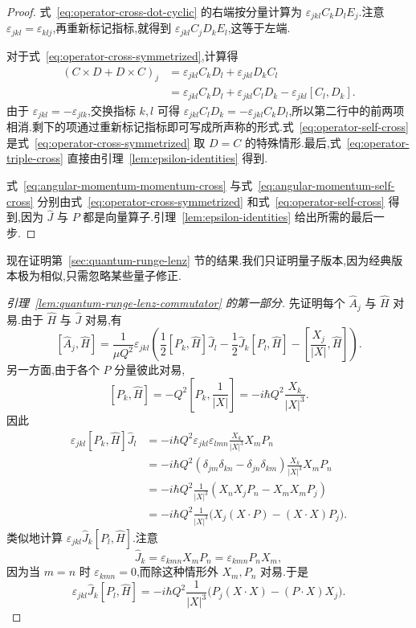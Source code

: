 {\begin{proof}
式~\eqref{eq:operator-cross-dot-cyclic} 的右端按分量计算为 $\varepsilon_{jkl}C_kD_lE_j$.注意 $\varepsilon_{jkl}=\varepsilon_{klj}$,再重新标记指标,就得到 $\varepsilon_{jkl}C_jD_kE_l$,这等于左端.

对于式~\eqref{eq:operator-cross-symmetrized},计算得
\[
\begin{aligned}
 (C\times D+D\times C)_j
 &=\varepsilon_{jkl}C_kD_l+\varepsilon_{jkl}D_kC_l\\
 &=\varepsilon_{jkl}C_kD_l+\varepsilon_{jkl}C_lD_k
 -\varepsilon_{jkl}[C_l,D_k].
\end{aligned}
\label{eq:operator-cross-symmetrized-calculation}
\]
由于 $\varepsilon_{jkl}=-\varepsilon_{jlk}$,交换指标 $k,l$ 可得 $\varepsilon_{jkl}C_lD_k=-\varepsilon_{jkl}C_kD_l$,所以第二行中的前两项相消.剩下的项通过重新标记指标即可写成所声称的形式.式~\eqref{eq:operator-self-cross} 是式~\eqref{eq:operator-cross-symmetrized} 取 $D=C$ 的特殊情形.最后,式~\eqref{eq:operator-triple-cross} 直接由引理~\ref{lem:epsilon-identities} 得到.

式~\eqref{eq:angular-momentum-momentum-cross} 与式~\eqref{eq:angular-momentum-self-cross} 分别由式~\eqref{eq:operator-cross-symmetrized} 和式~\eqref{eq:operator-self-cross} 得到,因为 $\widehat J$ 与 $P$ 都是向量算子.引理~\ref{lem:epsilon-identities} 给出所需的最后一步.
\end{proof}

现在证明第~\ref{sec:quantum-runge-lenz} 节的结果.我们只证明量子版本,因为经典版本极为相似,只需忽略某些量子修正.

\begin{proof}[引理~\ref{lem:quantum-runge-lenz-commutator} 的第一部分]
先证明每个 $\widehat A_j$ 与 $\widehat H$ 对易.由于 $\widehat H$ 与 $\widehat J$ 对易,有
\[
 [\widehat A_j,\widehat H]
 =\frac1{\mu Q^2}\varepsilon_{jkl}\left(
 \frac12[ P_k,\widehat H]\widehat J_l
 -\frac12\widehat J_k[P_l,\widehat H]
 -\left[\frac{X_j}{|X|},\widehat H\right]\right).
\label{eq:quantum-runge-lenz-hamiltonian-commutator-start}
\]
另一方面,由于各个 $P$ 分量彼此对易,
\[
 [P_k,\widehat H]=-Q^2\left[P_k,\frac1{|X|}\right]
 =-i\hbar Q^2\frac{X_k}{|X|^3}.
\]
因此
\[
\begin{aligned}
 \varepsilon_{jkl}[P_k,\widehat H]\widehat J_l
 &=-i\hbar Q^2\varepsilon_{jkl}\varepsilon_{lmn}
 \frac{X_k}{|X|^3}X_mP_n\\
 &=-i\hbar Q^2(\delta_{jm}\delta_{kn}-\delta_{jn}\delta_{km})
 \frac{X_k}{|X|^3}X_mP_n\\
 &=-i\hbar Q^2\frac1{|X|^3}
 (X_nX_jP_n-X_mX_mP_j)\\
 &=-i\hbar Q^2\frac1{|X|^3}
 \bigl(X_j(X\cdot P)-(X\cdot X)P_j\bigr).
\end{aligned}
\label{eq:quantum-runge-lenz-commutator-term1}
\]
类似地计算 $\varepsilon_{jkl}\widehat J_k[P_l,\widehat H]$.注意
\[
 \widehat J_k=\varepsilon_{kmn}X_mP_n=\varepsilon_{kmn}P_nX_m,
\]
因为当 $m=n$ 时 $\varepsilon_{kmn}=0$,而除这种情形外 $X_m,P_n$ 对易.于是
\[
 \varepsilon_{jkl}\widehat J_k[P_l,\widehat H]
 =-i\hbar Q^2\frac1{|X|^3}
 \bigl(P_j(X\cdot X)-(P\cdot X)X_j\bigr).
\label{eq:quantum-runge-lenz-commutator-term2}
\]


\end{proof}}
